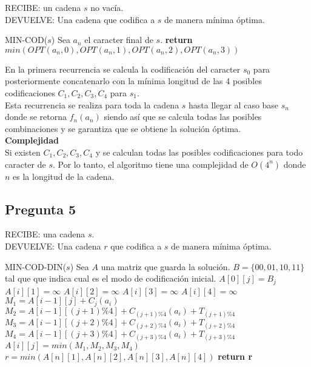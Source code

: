 \documentclass{article}
\begin{document}
\vspace{1cm}

\noindent RECIBE: un cadena $s$ no vacía.\\
DEVUELVE: Una cadena que codifica a $s$ de manera mínima óptima.
\begin{algorithmic}[1]
\item[]{MIN-COD($s$)}
\State Sea $a_n$ el caracter final de $s$.  
\State \textbf{return} $min(OPT(a_n,0), OPT(a_n,1), OPT(a_n,2), OPT(a_n,3))$  
\end{algorithmic}

En la primera recurrencia se calcula la codificación del caracter $s_0$ para posteriormente concatenarlo
con la mínima longitud de las 4 posibles codificaciones $C_1,C_2,C_3,C_4$ para $s_1$.\\
Esta recurrencia se realiza para toda la cadena $s$ hasta llegar al caso base $s_n$ donde se retorna $f_n(a_n)$
siendo así que se calcula todas las posibles combinaciones y se garantiza que se obtiene la solución óptima.\\

\textbf{Complejidad}\\
Si existen $C_1,C_2,C_3,C_4$ y se calculan todas las posibles codificaciones para todo caracter de $s$.
Por lo tanto, el algoritmo tiene una complejidad de $O(4^n)$ donde $n$ es la longitud de la cadena.



\subsection{Pregunta 5}
\noindent RECIBE: una cadena $s$.\\
DEVUELVE: Una cadena $r$ que codifica a $s$ de manera mínima óptima.

\begin{algorithmic}[1]
\item[]{MIN-COD-DIN($s$)}
\State Sea $A$ una matriz que guarda la solución.
\State $B=\{00, 01, 10, 11\}$ tal que que indica cual es el modo de codificación inicial.
    \State $A[0][j] = B_j$
\EndFor
{}
    \State $A[i][1] = \infty$
    \State $A[i][2] = \infty$
    \State $A[i][3] = \infty$
    \State $A[i][4] = \infty$
        \State $M_1 = A[i-1][j] + C_j(a_i)$
        \State $M_2 = A[i-1][(j+1)\%4] + C_{(j+1)\%4}(a_i) + T_{(j+1)\%4}$
        \State $M_3 = A[i-1][(j+2)\%4] + C_{(j+2)\%4}(a_i) + T_{(j+2)\%4}$
        \State $M_4 = A[i-1][(j+3)\%4] + C_{(j+3)\%4}(a_i) + T_{(j+3)\%4}$
        \State $A[i][j] = min(M_1, M_2, M_3, M_4)$
        \State
    \EndFor
\EndFor
\State $r = min(A[n][1], A[n][2], A[n][3], A[n][4])$
\State \textbf{return r}  
\end{algorithmic}
\end{document}
